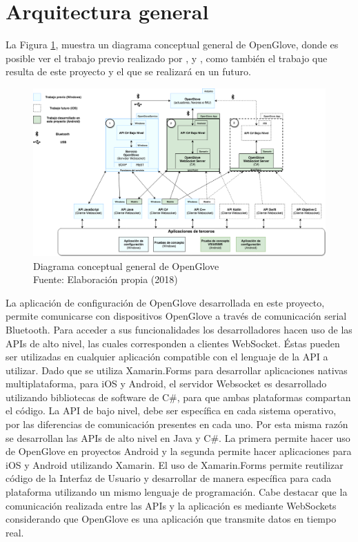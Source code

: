 \section{Arquitectura general}

La Figura \ref{fig:arquitectura-open-glove}, muestra un diagrama conceptual general de OpenGlove, donde es posible ver el trabajo previo realizado por \cite{tesis-monsalve-rodrigo}, \cite{tesis-meneses-sebastian} y \cite{tesis-cerda-rodrigo}, como también el trabajo que resulta de este proyecto y el que se realizará en un futuro.

\begin{figure}[H]
  \begin{center} 
   	\includegraphics[width=1.0\textwidth]{images/chapter04/OpenGlove-Architecture-General.png} 
    \caption[Diagrama conceptual general de OpenGlove]{Diagrama conceptual general de OpenGlove \\Fuente: Elaboración propia (2018)}
    \label{fig:arquitectura-open-glove}
  \end{center}
\end{figure}

La aplicación de configuración de OpenGlove desarrollada en este proyecto, permite comunicarse con dispositivos OpenGlove a través de comunicación serial Bluetooth. Para acceder a sus funcionalidades los desarrolladores hacen uso de las APIs de alto nivel, las cuales corresponden a clientes WebSocket. Éstas pueden ser utilizadas en cualquier aplicación compatible con el lenguaje de la API a utilizar. Dado que se utiliza Xamarin.Forms para desarrollar aplicaciones nativas multiplataforma, para iOS y Android, el servidor Websocket es desarrollado utilizando bibliotecas de software de C\#, para que ambas plataformas compartan el código. La API de bajo nivel, debe ser específica en cada sistema operativo, por las diferencias de comunicación presentes en cada uno. Por esta misma razón se desarrollan las APIs de alto nivel en  Java y C\#. La primera permite hacer uso de OpenGlove en proyectos Android y la segunda permite hacer aplicaciones para iOS y Android utilizando Xamarin. El uso de Xamarin.Forms permite reutilizar código de la Interfaz de Usuario y desarrollar de manera específica para cada plataforma utilizando un mismo lenguaje de programación. Cabe destacar que la comunicación realizada entre las APIs y la aplicación es mediante WebSockets considerando que OpenGlove es una aplicación que transmite datos en tiempo real.

